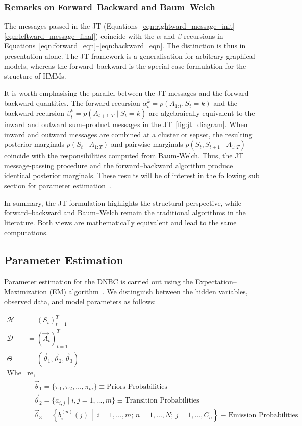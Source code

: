 \subsubsection*{Remarks on Forward–Backward and Baum–Welch}
The messages passed in the JT (Equations~\ref{eqn:rightward_message_init} - \ref{eqn:leftward_message_final}) coincide with the $\alpha$ and $\beta$ recursions in Equations~\ref{eqn:forward_eqn}–\ref{eqn:backward_eqn}. The distinction is thus in presentation alone. The JT framework is a generalisation for arbitrary graphical models, whereas the forward–backward is the special case formulation for the structure of HMMs\cite{hmm_slides}.

It is worth emphasising the parallel between the JT messages and the forward–backward quantities. The forward recursion $\alpha_t^k=p(A_{1:t},S_t=k)$ and the backward recursion $\mathit{\beta_t^k=p(A_{t+1:T}\mid S_t=k)}$ are algebraically equivalent to the inward and outward sum–product messages in the JT~\ref{fig:jt_diagram}. When inward and outward messages are combined at a cluster or sepset, the resulting posterior marginals $p(S_t \mid A_{1:T})$ and pairwise marginals $p(S_t,S_{t+1}\mid A_{1:T})$ coincide with the responsibilities computed from Baum-Welch. Thus, the JT message-passing procedure and the forward–backward algorithm produce identical posterior marginals. These results will be of interest in the following sub section for parameter estimation~\cite{aviles,dnbc_drought_first,hmm_slides,wiki:baum_welch}.

In summary, the JT formulation highlights the structural perspective, while forward–backward and Baum–Welch remain the traditional algorithms in the literature. Both views are mathematically equivalent and lead to the same computations.

\subsection{Parameter Estimation}
\label{sec:param_estimation}
Parameter estimation for the DNBC is carried out using the Expectation–Maximization (EM) algorithm~\cite{moon_tk}.  
We distinguish between the hidden variables, observed data, and model parameters as follows:

\begin{align*}
    \mathcal{H} &= (S_t)_{t=1}^T  \\
    \mathcal{D} &= (\vec{A}_t)_{t=1}^T  \\
    \Theta &= (\vec{\theta}_1, \vec{\theta}_2, \vec{\theta}_3)  \\
    \text{Whe}& \text{re,} \\
     & \quad \vec{\theta}_1 = \{\pi_1, \pi_2, \dots, \pi_m\} \equiv \text{Priors Probabilities}  \\
     & \quad \vec{\theta}_2 = \{a_{i,j} \mid i,j = 1, \dots, m\} \equiv \text{Transition Probabilities}  \\
     & \quad \vec{\theta}_3 = \left\{ b_i^{(n)}(j) \,\middle|\, i = 1,\dots,m; \, n = 1,\dots,N; \, j = 1,\dots,C_n \right\} \equiv \text{Emission Probabilities} 
\end{align*}

